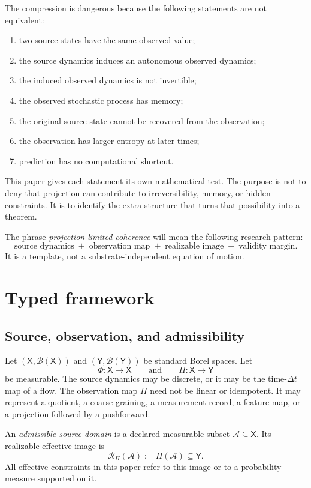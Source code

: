\documentclass[11pt]{article}
\newcommand{\X}{\mathsf X}
\newcommand{\Y}{\mathsf Y}
\newcommand{\A}{\mathcal A}
\newcommand{\Rset}{\mathcal R}
\newcommand{\B}{\mathcal B}
\begin{document}
The compression is dangerous because the following statements are not
equivalent:
\begin{enumerate}
\item two source states have the same observed value;
\item the source dynamics induces an autonomous observed dynamics;
\item the induced observed dynamics is not invertible;
\item the observed stochastic process has memory;
\item the original source state cannot be recovered from the observation;
\item the observation has larger entropy at later times;
\item prediction has no computational shortcut.
\end{enumerate}
This paper gives each statement its own mathematical test.  The purpose is
not to deny that projection can contribute to irreversibility, memory, or
hidden constraints.  It is to identify the extra structure that turns that
possibility into a theorem.

The phrase \emph{projection-limited coherence} will mean the following
research pattern:
\[
  \text{source dynamics}
  \;+\;\text{observation map}
  \;+\;\text{realizable image}
  \;+\;\text{validity margin}.
\]
It is a template, not a substrate-independent equation of motion.

\section{Typed framework}

\subsection{Source, observation, and admissibility}

Let $(\X,\B(\X))$ and $(\Y,\B(\Y))$ be standard Borel spaces.  Let
\[
  \Phi:\X\longrightarrow\X
  \qquad\text{and}\qquad
  \Pi:\X\longrightarrow\Y
\]
be measurable.  The source dynamics may be discrete, or it may be the
time-$\Delta t$ map of a flow.  The observation map $\Pi$ need not be
linear or idempotent.  It may represent a quotient, a coarse-graining, a
measurement record, a feature map, or a projection followed by a
pushforward.

\begin{definition}
An \emph{admissible source domain} is a declared measurable subset
$\A\subseteq\X$.  Its realizable effective image is
\[
  \Rset_\Pi(\A):=\Pi(\A)\subseteq\Y.
\]
All effective constraints in this paper refer to this image or to a
probability measure supported on it.
\end{definition}
\end{document}
